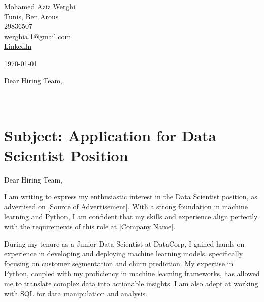 \documentclass[10pt]{article}
\begin{document}
\begin{flushleft}
Mohamed Aziz Werghi \\
Tunis, Ben Arous \\
29836507 \\
\href{mailto:werghia.1@gmail.com}{werghia.1@gmail.com} \\
\href{https://linkedin.com/in/azizwerghi}{LinkedIn}
\end{flushleft}

\vfill %

\today

\vspace{12pt} %

\begin{flushleft}
Dear Hiring Team, \\ %
[Hiring Manager Title] \\
[Company Name] \\
[Company Address]
\end{flushleft}

\vspace{12pt} %

\section*{Subject: Application for Data Scientist Position}
\vspace{-12pt} %

Dear Hiring Team,

I am writing to express my enthusiastic interest in the Data Scientist position, as advertised on [Source of Advertisement]. With a strong foundation in machine learning and Python, I am confident that my skills and experience align perfectly with the requirements of this role at [Company Name].

During my tenure as a Junior Data Scientist at DataCorp, I gained hands-on experience in developing and deploying machine learning models, specifically focusing on customer segmentation and churn prediction. My expertise in Python, coupled with my proficiency in machine learning frameworks, has allowed me to translate complex data into actionable insights. I am also adept at working with SQL for data manipulation and analysis.
\end{document}
